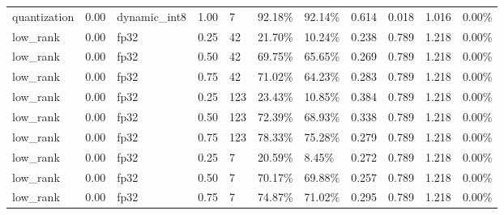 \begin{table}[t]
\begin{tabular}{lllllllllll}
quantization & 0.00 & dynamic\_int8 & 1.00 & 7 & 92.18\% & 92.14\% & 0.614 & 0.018 & 1.016 & 0.00\% \\
low\_rank & 0.00 & fp32 & 0.25 & 42 & 21.70\% & 10.24\% & 0.238 & 0.789 & 1.218 & 0.00\% \\
low\_rank & 0.00 & fp32 & 0.50 & 42 & 69.75\% & 65.65\% & 0.269 & 0.789 & 1.218 & 0.00\% \\
low\_rank & 0.00 & fp32 & 0.75 & 42 & 71.02\% & 64.23\% & 0.283 & 0.789 & 1.218 & 0.00\% \\
low\_rank & 0.00 & fp32 & 0.25 & 123 & 23.43\% & 10.85\% & 0.384 & 0.789 & 1.218 & 0.00\% \\
low\_rank & 0.00 & fp32 & 0.50 & 123 & 72.39\% & 68.93\% & 0.338 & 0.789 & 1.218 & 0.00\% \\
low\_rank & 0.00 & fp32 & 0.75 & 123 & 78.33\% & 75.28\% & 0.279 & 0.789 & 1.218 & 0.00\% \\
low\_rank & 0.00 & fp32 & 0.25 & 7 & 20.59\% & 8.45\% & 0.272 & 0.789 & 1.218 & 0.00\% \\
low\_rank & 0.00 & fp32 & 0.50 & 7 & 70.17\% & 69.88\% & 0.257 & 0.789 & 1.218 & 0.00\% \\
low\_rank & 0.00 & fp32 & 0.75 & 7 & 74.87\% & 71.02\% & 0.295 & 0.789 & 1.218 & 0.00\% \\
\bottomrule
\end{tabular}
\end{table}
